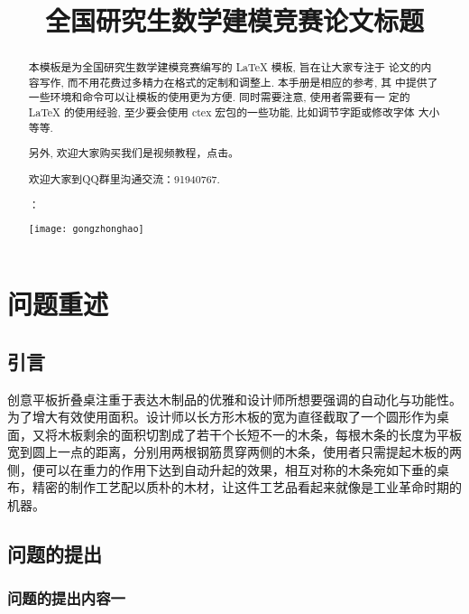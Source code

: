 \documentclass[bwprint]{gmcmthesis}
\title{全国研究生数学建模竞赛论文标题}
\begin{document}
 
 \maketitle
 
\begin{abstract}
本模板是为全国研究生数学建模竞赛编写的 \LaTeX{} 模板, 旨在让大家专注于
论文的内容写作, 而不用花费过多精力在格式的定制和调整上. 本手册是相应的参考, 其
中提供了一些环境和命令可以让模板的使用更为方便. 同时需要注意, 使用者需要有一
定的 \LaTeX{} 的使用经验, 至少要会使用 ctex 宏包的一些功能, 比如调节字距或修改字体
大小等等.


另外, 欢迎大家购买我们是视频教程，点击\href{https://item.taobao.com/item.htm?spm=a1z10.1-c.w4004-3473795048.4.ThFQCG&id=43823508044}{}。

欢迎大家到QQ群里沟通交流：91940767.

：

\centerline{\texttt{[image: gongzhonghao]}}


\end{abstract}

\pagestyle{plain}

\tableofcontents

\section{问题重述}

\subsection{引言}

创意平板折叠桌注重于表达木制品的优雅和设计师所想要强调的自动化与功能性。为了增大有效使用面积。设计师以长方形木板的宽为直径截取了一个圆形作为桌面，又将木板剩余的面积切割成了若干个长短不一的木条，每根木条的长度为平板宽到圆上一点的距离，分别用两根钢筋贯穿两侧的木条，使用者只需提起木板的两侧，便可以在重力的作用下达到自动升起的效果，相互对称的木条宛如下垂的桌布，精密的制作工艺配以质朴的木材，让这件工艺品看起来就像是工业革命时期的机器。

\subsection{问题的提出}

\subsubsection{问题的提出内容一}
\end{document}
